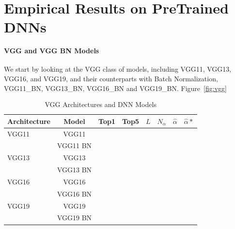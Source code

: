 \vspace{-4mm}

\section{Empirical Results on PreTrained DNNs}
\label{sxn:emp}

\paragraph{VGG and VGG BN Models}

We start by looking at the VGG class of models, including VGG11, VGG13, VGG16, and VGG19, and their counterparts with Batch Normalization, 
VGG11\_BN, VGG13\_BN, VGG16\_BN and VGG19\_BN.  Figure~\ref{fig:vgg}

\begin{table}[t]
\small
\begin{center}
\begin{tabular}{|p{1in}|c|c|c|c|c|c|c|}
\hline
Architecture 
 & Model &Top1 
 & Top5 & $L$ & $N_{\alpha}$ & $\hat{\alpha}$ & $\hat{\alpha}*$ \\
\hline
VGG11 & VGG11 &  & & & & \\
  & VGG11 BN & & \\
\hline
VGG13 & VGG13 & & \\
  & VGG13 BN & &\\
\hline
VGG16 & VGG16 & & \\
  & VGG16 BN & & \\
\hline
VGG19 & VGG19 & \\
  & VGG19 BN & & \\
\hline
\end{tabular}
\end{center}
\caption{VGG Architectures and DNN Models}
\label{table:models}
\end{table}


